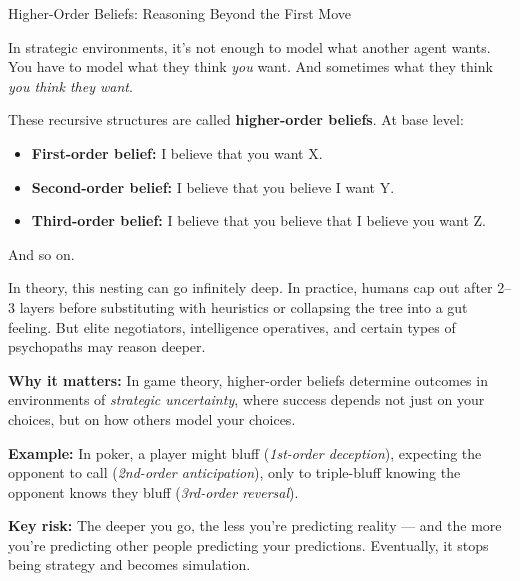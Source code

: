 \begin{TechnicalSidebar}{Higher-Order Beliefs: Reasoning Beyond the First Move}

    In strategic environments, it’s not enough to model what another agent wants.  
    You have to model what they think \textit{you} want.  
    And sometimes what they think \textit{you think they want}.
    
    \medskip
    
    These recursive structures are called \textbf{higher-order beliefs}. At base level:
    
    \medskip
    
    \begin{itemize}
      \item \textbf{First-order belief:} I believe that you want X.
      \item \textbf{Second-order belief:} I believe that you believe I want Y.
      \item \textbf{Third-order belief:} I believe that you believe that I believe you want Z.
    \end{itemize}

    \medskip
    
    And so on.
    
    \medskip
    
    In theory, this nesting can go infinitely deep.  
    In practice, humans cap out after 2–3 layers before substituting with heuristics or collapsing 
    the tree into a gut feeling.  
    But elite negotiators, intelligence operatives, and certain types of psychopaths may reason 
    deeper.
    
    \medskip
    
    \textbf{Why it matters:}  
    In game theory, higher-order beliefs determine outcomes in environments of \emph{strategic 
    uncertainty}, where success depends not just on your choices, but on how others model your choices.
    
    \medskip
    
    \textbf{Example:} In poker, a player might bluff (\textit{1st-order deception}), expecting the 
    opponent to call (\textit{2nd-order anticipation}), only to triple-bluff knowing the opponent 
    knows they bluff (\textit{3rd-order reversal}).
    
    \medskip
    
    \textbf{Key risk:}  
    The deeper you go, the less you're predicting reality — and the more you're predicting other 
    people predicting your predictions.  
    Eventually, it stops being strategy and becomes simulation.
    
\end{TechnicalSidebar}

